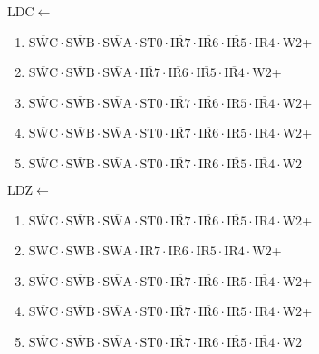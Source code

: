 \documentclass[UTF8]{ctexart}
\begin{document}
LDC$\leftarrow$
\begin{enumerate}[\indent\indent]
	\item$\overline{\text{SWC}}\cdot\overline{\text{SWB}}\cdot\overline{\text{SWA}}\cdot\text{ST0}\cdot\overline{\text{IR7}}\cdot\overline{\text{IR6}}\cdot\overline{\text{IR5}}\cdot\text{IR4}\cdot\text{W2}$+
	\item $\overline{\text{SWC}} \cdot\overline{\text{SWB}}\cdot \overline{\text{SWA}} \cdot \overline{\text{IR7}} \cdot \overline{\text{IR6}} \cdot \overline{\text{IR5}} \cdot \overline{\text{IR4} }\cdot \text{W2}$+\item$\overline{\text{SWC}}\cdot\overline{\text{SWB}}\cdot\overline{\text{SWA}}\cdot\text{ST0}\cdot\overline{\text{IR7}}\cdot\overline{\text{IR6}}\cdot{\text{IR5}}\cdot\overline{\text{IR4}}\cdot\text{W2}$+
	\item$\overline{\text{SWC}}\cdot\overline{\text{SWB}}\cdot\overline{\text{SWA}}\cdot\text{ST0}\cdot\overline{\text{IR7}}\cdot\overline{\text{IR6}}\cdot\text{IR5}\cdot\text{IR4}\cdot\text{W2}$+
	\item$\overline{\text{SWC}}\cdot\overline{\text{SWB}}\cdot\overline{\text{SWA}}\cdot\text{ST0}\cdot\overline{\text{IR7}}\cdot{\text{IR6}}\cdot\overline{\text{IR5}}\cdot\overline{\text{IR4}}\cdot\text{W2}$
\end{enumerate}
LDZ$\leftarrow$
\begin{enumerate}[\indent\indent]
	\item$\overline{\text{SWC}}\cdot\overline{\text{SWB}}\cdot\overline{\text{SWA}}\cdot\text{ST0}\cdot\overline{\text{IR7}}\cdot\overline{\text{IR6}}\cdot\overline{\text{IR5}}\cdot\text{IR4}\cdot\text{W2}$+
	\item $\overline{\text{SWC}} \cdot\overline{\text{SWB}}\cdot \overline{\text{SWA}} \cdot \overline{\text{IR7}} \cdot \overline{\text{IR6}} \cdot \overline{\text{IR5}} \cdot \overline{\text{IR4} }\cdot \text{W2}$+\item$\overline{\text{SWC}}\cdot\overline{\text{SWB}}\cdot\overline{\text{SWA}}\cdot\text{ST0}\cdot\overline{\text{IR7}}\cdot\overline{\text{IR6}}\cdot{\text{IR5}}\cdot\overline{\text{IR4}}\cdot\text{W2}$+
	\item$\overline{\text{SWC}}\cdot\overline{\text{SWB}}\cdot\overline{\text{SWA}}\cdot\text{ST0}\cdot\overline{\text{IR7}}\cdot\overline{\text{IR6}}\cdot\text{IR5}\cdot\text{IR4}\cdot\text{W2}$+
	\item$\overline{\text{SWC}}\cdot\overline{\text{SWB}}\cdot\overline{\text{SWA}}\cdot\text{ST0}\cdot\overline{\text{IR7}}\cdot{\text{IR6}}\cdot\overline{\text{IR5}}\cdot\overline{\text{IR4}}\cdot\text{W2}$
\end{enumerate}
\end{document}
